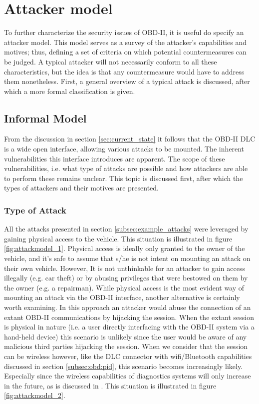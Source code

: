 \section{Attacker model} 
\label{sec:attacker_model}

To further characterize the security issues of OBD-II, it is useful do specify an attacker model. This model serves as a survey of the attacker's capabilities and motives; thus, defining a set of criteria on which potential countermeasures can be judged. A typical attacker will not necessarily conform to all these characteristics, but the idea is that any countermeasure would have to address them nonetheless. First, a general overview of a typical attack is discussed, after which a more formal classification is given.

\subsection{Informal Model}
\label{subsec:informal_model}

From the discussion in section \ref{sec:current_state} it follows that the OBD-II DLC is a wide open interface, allowing various attacks to be mounted. The inherent vulnerabilities this interface introduces are apparent. The scope of these vulnerabilities, i.e. what type of attacks are possible and how attackers are able to perform these remains unclear. This topic is discussed first, after which the types of attackers and their motives are presented.

\subsubsection{Type of Attack}  
All the attacks presented in section \ref{subsec:example_attacks} were leveraged by gaining physical access to the vehicle. This situation is illustrated in figure \ref{fig:attackmodel_1}. Physical access is ideally only granted to the owner of the vehicle, and it's safe to assume that s/he is not intent on mounting an attack on their own vehicle. However, It is not unthinkable for an attacker to gain access illegally (e.g. car theft) or by abusing privileges that were bestowed on them by the owner (e.g. a repairman). While physical access is the most evident way of mounting an attack via the OBD-II interface, another alternative is certainly worth examining. In this approach an attacker would abuse the connection of an extant OBD-II communications by hijacking the session. When the extant session is physical in nature (i.e. a user directly interfacing with the OBD-II system via a hand-held device) this scenario is unlikely since the user would be aware of any malicious third parties hijacking the session. When we consider that the session can be wireless however, like the DLC connector with wifi/Bluetooth capabilities discussed in section \ref{subsec:obd:pid}, this scenario becomes increasingly likely. Especially since the wireless capabilities of diagnostics systems will only increase in the future, as is discussed in \cite{Kleberger}. This situation is illustrated in figure \ref{fig:attackmodel_2}.


